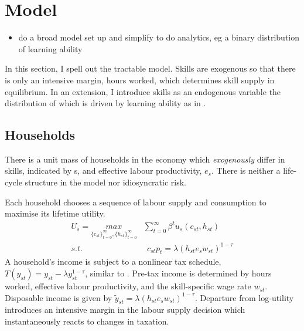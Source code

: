 \section{Model}
\begin{itemize}
	\item do a broad model set up and simplify to do analytics, eg a binary distribution of learning ability
\end{itemize}
In this section, I spell out the tractable model. Skills are exogenous so that there is only an intensive margin, hours worked, which determines skill supply in equilibrium. In an extension, I introduce  skills as an endogenous variable the distribution of which is driven by learning ability as in \cite{Heathcote2017OptimalFramework}. 

\subsection{Households}
There is a unit mass of households in the economy which \textit{exogenously} differ in skills, indicated by s, and effective labour productivity, $e_{s}$. There is neither a life-cycle structure in the model nor idiosyncratic risk.

Each household chooses a sequence of labour supply and consumption to maximise its lifetime utility. 
\begin{align}
U_{s}=\underset{\{c_{st}\}_{t=0}^{\infty}, \{h_{st}\}_{t=0}^{\infty}}{max}&\sum_{t=0}^{\infty}\beta^t u_s(c_{st}, h_{st})\\
s.t.& \ \ c_{st}p_{t}=\lambda \left(h_{st}e_{s}w_{st}\right)^{1-\tau}
\end{align}
A household's income is subject to a nonlinear tax schedule, $T(y_{st})=y_{st}-\lambda y_{st}^{1-\tau}$, similar to \cite{Heathcote2017OptimalFramework}. Pre-tax income is determined by hours worked, effective labour productivity, and the skill-specific wage rate $w_{st}$. Disposable income is given by $\tilde{y}_{st}=\lambda \left(h_{st}e_{s}w_{st}\right)^{1-\tau}$.
Departure from log-utility introduces an intensive margin in the labour supply decision which instantaneously reacts to changes in taxation. 

